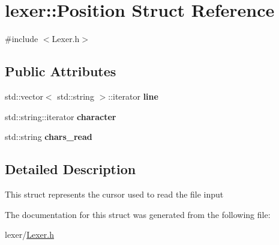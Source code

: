 \hypertarget{structlexer_1_1Position}{}\section{lexer\+:\+:Position Struct Reference}
\label{structlexer_1_1Position}


{\ttfamily \#include $<$Lexer.\+h$>$}

\subsection*{Public Attributes}
\begin{DoxyCompactItemize}
\item 
\mbox{\label{structlexer_1_1Position_a04c39fe571e9afc8dad6f659ab2271f6}} 
std\+::vector$<$ std\+::string $>$\+::iterator {\bfseries line}
\item 
\mbox{\label{structlexer_1_1Position_a3a02b3f6c6aaa411bb6845389283cc23}} 
std\+::string\+::iterator {\bfseries character}
\item 
\mbox{\label{structlexer_1_1Position_a1b457b24326fd14c91d156b0148cabdf}} 
std\+::string {\bfseries chars\+\_\+read}
\end{DoxyCompactItemize}


\subsection{Detailed Description}
This struct represents the cursor used to read the file input 

The documentation for this struct was generated from the following file\+:\begin{DoxyCompactItemize}
\item 
lexer/\hyperlink{Lexer_8h}{Lexer.\+h}\end{DoxyCompactItemize}
